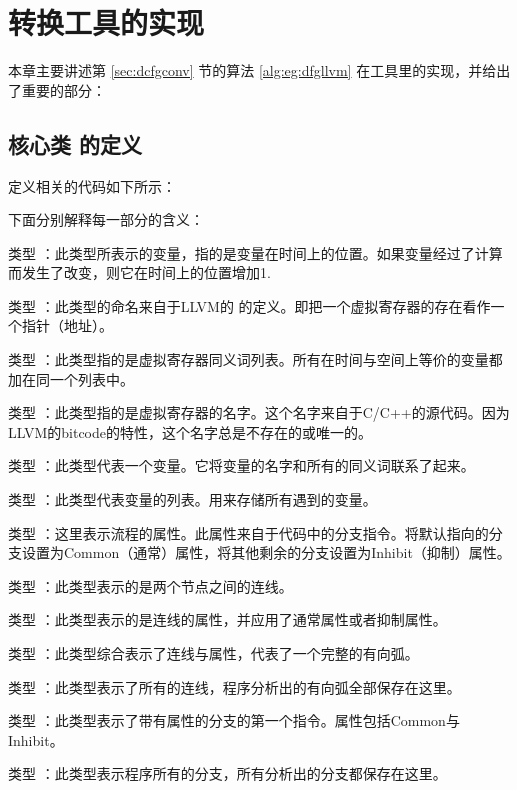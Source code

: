 \section{转换工具的实现}

本章主要讲述第 \ref{sec:dcfgconv} 节的算法 \ref{alg:eg:dfgllvm} 
在工具里的实现，并给出了重要的部分：

\subsection{核心类  的定义}
定义相关的代码如下所示：

{
    
}

下面分别解释每一部分的含义：

类型 ：此类型所表示的变量，指的是变量在时间上的位置。如果变量经过了计算而发生了改变，则它在时间上的位置增加1.

类型 ：此类型的命名来自于LLVM的  的定义。即把一个虚拟寄存器的存在看作一个指针（地址）。

类型 ：此类型指的是虚拟寄存器同义词列表。所有在时间与空间上等价的变量都加在同一个列表中。

类型 ：此类型指的是虚拟寄存器的名字。这个名字来自于C/C++的源代码。因为LLVM的bitcode的特性，这个名字总是不存在的或唯一的。

类型 ：此类型代表一个变量。它将变量的名字和所有的同义词联系了起来。

类型 ：此类型代表变量的列表。用来存储所有遇到的变量。

类型 ：这里表示流程的属性。此属性来自于代码中的分支指令。将默认指向的分支设置为Common（通常）属性，将其他剩余的分支设置为Inhibit（抑制）属性。

类型 ：此类型表示的是两个节点之间的连线。

类型 ：此类型表示的是连线的属性，并应用了通常属性或者抑制属性。

类型 ：此类型综合表示了连线与属性，代表了一个完整的有向弧。

类型 ：此类型表示了所有的连线，程序分析出的有向弧全部保存在这里。

类型 ：此类型表示了带有属性的分支的第一个指令。属性包括Common与Inhibit。

类型 ：此类型表示程序所有的分支，所有分析出的分支都保存在这里。

